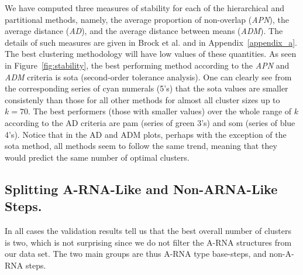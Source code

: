 We  have  computed  three  measures  of  stability  for  each  of  the
hierarchical and  partitional methods, namely,  the average proportion
of non-overlap (\textit{APN}), the average distance (\textit{AD}), and
the  average distance  between means  (\textit{ADM}).  The  details of
such  measures are  given in  Brock  et al.   \cite{brock2008} and  in
Appendix~\ref{appendix_a}. The  best clustering methodology  will have
low     values     of     these     quantities.     As     seen     in
Figure~\ref{fig:stability},  the best  performing method  according to
the  \textit{APN}  and  \textit{ADM}  criteria is  sota  (second-order
tolerance analysis). One can clearly see from the corresponding series
of cyan  numerals (5's) that  the sota values are  smaller consistenly
than those  for all other methods  for almost all cluster  sizes up to
$k=70$.   The best  performers (those  with smaller  values)  over the
whole range  of $k$ according  to the AD  criteria are pam  (series of
green 3's) and som (series of blue 4's). Notice that in the AD and ADM
plots, perhaps with the exception of the sota method, all methods seem
to follow  the same  trend, meaning that  they would predict  the same
number of optimal clusters.

\subsection{Splitting A-RNA-Like and Non-ARNA-Like Steps.}
In  all cases the  validation results  tell us  that the  best overall
number of  clusters is two,  which is not  surprising since we  do not
filter the  A-RNA structures from our  data set.  The  two main groups
are thus A-RNA type base-steps, and non-A-RNA steps.

